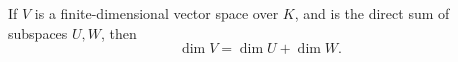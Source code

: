 \documentclass[../main.tex]{subfiles}
\begin{document}
        \begin{theorem} \label{thm:direct_sum_dimension}
        If \( V \) is a finite-dimensional vector space over \( K \), and is the direct sum of subspaces \( U, W \), then
        \[
        \dim V = \dim U + \dim W.
        \]
        \end{theorem}
        
    
    
    
    
    
    
    
    
    
    
    
    
    
    
\end{document}
